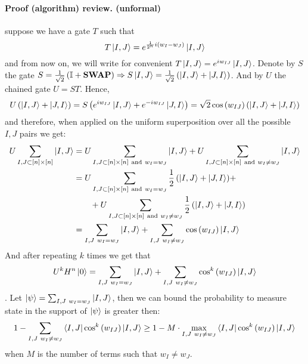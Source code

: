 \documentclass{article}
\begin{document}
\paragraph{Proof (algorithm) review. (unformal)} suppose we have a gate \( T \) such that \begin{equation*}
    T \ket{I,J} = e^{\frac{1}{2^n}i\left(w_I - w_J \right) }\ket{I,J}  
\end{equation*} 
and from now on, we will write for convenient \( T \ket{I,J} = e^{i w_{IJ}  }\ket{I,J}  \). Denote by \( S \) the gate \( S = \frac{1}{\sqrt{2}}\left(\mathbb{I} + \mathbf{SWAP}\right) \Rightarrow S\ket{I,J} = \frac{1}{\sqrt{2}}\left( \ket{I,J} + \ket{J,I} \right) \).  And by \(U\) the chained gate \( U = ST \). Hence, \begin{equation*}
    U\left(\ket{I,J} + \ket{J,I}\right) = S\left(e^{iw_{IJ}}\ket{I,J} + e^{-iw_{IJ}}\ket{J,I}\right) = \sqrt{2}\cos\left( w_{IJ} \right)\left(\ket{I,J} + \ket{J,I}\right)
\end{equation*}
and therefore, when applied on the uniform superposition over all the possible \(I,J\) pairs we get: 
\begin{equation*}
\begin{split}
    U\sum_{I,J\subset [n]\times[n]}{\ket{I,J}} & =  U\sum_{I,J\subset [n]\times[n] \ \text{and} \ w_{I}=w_{J}}{\ket{I,J}} + U\sum_{I,J\subset [n]\times[n] \ \text{and} \ w_{I} \neq w_{J}}{\ket{I,J}}  \\
    & = U\sum_{I,J\subset [n]\times[n] \ \text{and} \ w_{I}=w_{J}}{\frac{1}{2}\left(\ket{I,J}+ \ket{J,I}\right)} + \\ & \ \  \ \ \ \ + U\sum_{I,J\subset [n]\times[n] \ \text{and} \ w_{I} \neq w_{J}}{\frac{1}{2}\left(\ket{I,J}+ \ket{J,I}\right)} \\ 
    & = \sum_{I,J \ w_{I}=w_{J}}{\ket{I,J}} + \sum_{I,J \ w_{I} \neq w_{J}}{\cos\left( w_{IJ} \right)\ket{I,J}} 
\end{split}
\end{equation*}
And after repeating \(k\) times we get that 
\begin{equation*} 
    U^{k}H^{n}\ket{0} = \sum_{I,J \ w_{I}=w_{J}}{\ket{I,J}} + \sum_{I,J \ w_{I} \neq w_{J}}{\cos^{k}\left( w_{IJ} \right)\ket{I,J}}
\end{equation*}. Let \( \ket{\psi} = \sum_{I,J \ w_{I}=w_{J}}{\ket{I,J}} \), then we can bound the probability to measure state in the support of \( \ket{\psi}\) is greater then: 
\begin{equation*}
    1 -\sum_{I,J \ w_{I} \neq w_{J}} {\bra{I,J}\cos^{k}\left( w_{IJ} \right)\ket{I,J}} \ge 1 - M\cdot\max_{I,J \ w_{I} \neq w_{J}}{\bra{I,J}\cos^{k}\left( w_{IJ} \right)\ket{I,J}} 
\end{equation*} when \(M\) is the number of terms such that \(w_I \neq w_J\).
\end{document}
